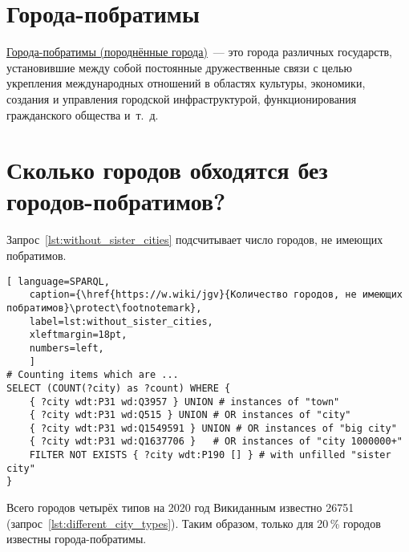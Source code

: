 \section{Города-побратимы}

\href{https://w.wiki/pRe}{Города-побратимы (породнённые города)}~--- это города различных государств, установившие между собой постоянные дружественные связи с целью укрепления международных отношений в областях культуры, экономики, создания и управления городской инфраструктурой, 
функционирования гражданского общества и~т.~д.%



\section{Сколько городов обходятся без городов-побратимов?}

Запрос~\ref{lst:without_sister_cities} подсчитывает число городов, не имеющих побратимов.

\begin{lstlisting}[ language=SPARQL, 
    caption={\href{https://w.wiki/jgv}{Количество городов, не имеющих побратимов}\protect\footnotemark},
    label=lst:without_sister_cities,
    xleftmargin=18pt, 
    numbers=left,
    ]
# Counting items which are ... 
SELECT (COUNT(?city) as ?count) WHERE {                             
	{ ?city wdt:P31 wd:Q3957 } UNION # instances of "town"          
	{ ?city wdt:P31 wd:Q515 } UNION # OR instances of "city"                 
	{ ?city wdt:P31 wd:Q1549591 } UNION # OR instances of "big city"                       
	{ ?city wdt:P31 wd:Q1637706 } 	# OR instances of "city 1000000+"              
	FILTER NOT EXISTS { ?city wdt:P190 [] } # with unfilled "sister city"
}
\end{lstlisting}

Всего городов четырёх типов на 2020 год Викиданным известно \num{26751} (запрос~\ref{lst:different_city_types}). 
Таким образом, только для 20\,\% городов известны города-побратимы.

